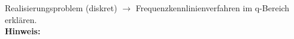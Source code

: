 \begin{question}[section=6,name={Realisierungsproblem},difficulty=,type=mdl,tags={}]
	Realisierungsproblem (diskret) $\rightarrow$ Frequenzkennlinienverfahren im q-Bereich erklären.
	\\ \textbf{Hinweis:}\\
	
\end{question}
\begin{solution}
	
\end{solution}